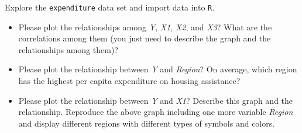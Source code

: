 \documentclass[12pt,letterpaper]{article}
\begin{document}
\vspace{.5cm}
\noindent Explore the \texttt{expenditure} data set and import data into \texttt{R}.
\vspace{.5cm}
  
\vspace{.5cm}
\begin{itemize}

\item
Please plot the relationships among \emph{Y}, \emph{X1}, \emph{X2}, and \emph{X3}? What are the correlations among them (you just need to describe the graph and the relationships among them)?
\vspace{.5cm}
\item
Please plot the relationship between \emph{Y} and \emph{Region}? On average, which region has the highest per capita expenditure on housing assistance?
\vspace{.5cm}
\item
Please plot the relationship between \emph{Y} and \emph{X1}? Describe this graph and the relationship. Reproduce the above graph including one more variable \emph{Region} and display different regions with different types of symbols and colors.
\end{itemize}
\end{document}
